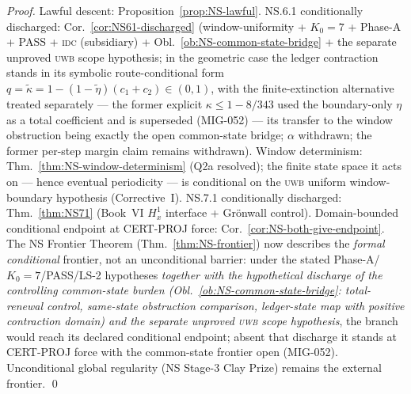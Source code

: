 \documentclass[12pt,oneside]{amsbook}
\theoremstyle{plain}
\theoremstyle{definition}
\theoremstyle{remark}
\begin{document}
\begin{proof}
Lawful descent: Proposition~\ref{prop:NS-lawful}.
NS.6.1 conditionally discharged:
Cor.~\ref{cor:NS61-discharged} (window-uniformity + $K_0=7$
+ Phase-A + PASS + \textsc{idc} (subsidiary) +
Obl.~\ref{ob:NS-common-state-bridge} + the separate unproved
\textsc{uwb} scope hypothesis; in the geometric case the ledger
contraction stands in its symbolic route-conditional form
$q=\widetilde\kappa = 1-(1-\widetilde\eta)(c_1+c_2)\in(0,1)$,
with the finite-extinction alternative treated separately --- the
former explicit $\kappa\le 1-8/343$ used the boundary-only
$\eta$ as a total coefficient and is superseded (MIG-052) --- its
transfer to the window obstruction being exactly the open
common-state bridge; $\alpha$ withdrawn; the former per-step
margin claim remains withdrawn).
Window determinism: Thm.~\ref{thm:NS-window-determinism}
(Q2a resolved); the finite state space it acts on --- hence
eventual periodicity --- is conditional on the \textsc{uwb}
uniform window-boundary hypothesis (Corrective~I).
NS.7.1 conditionally discharged: Thm.~\ref{thm:NS71}
(Book~VI $H^1_x$ interface + Gr\"{o}nwall control).
Domain-bounded conditional endpoint at CERT-PROJ force:
Cor.~\ref{cor:NS-both-give-endpoint}.
The NS Frontier Theorem (Thm.~\ref{thm:NS-frontier}) now describes
the \emph{formal conditional} frontier, not an unconditional
barrier: under the stated Phase-A/$K_0=7$/PASS/LS-2 hypotheses
\emph{together with the hypothetical discharge of the controlling
common-state burden (Obl.~\ref{ob:NS-common-state-bridge}:
total-renewal control, same-state obstruction comparison,
ledger-state map with positive contraction domain) and the separate
unproved \textsc{uwb} scope hypothesis}, the branch
would reach its declared conditional endpoint; absent that
discharge it stands at CERT-PROJ force with the common-state
frontier open (MIG-052). Unconditional global regularity
(NS Stage-3 Clay Prize) remains the external frontier.
\qed
\end{proof}
\end{document}
